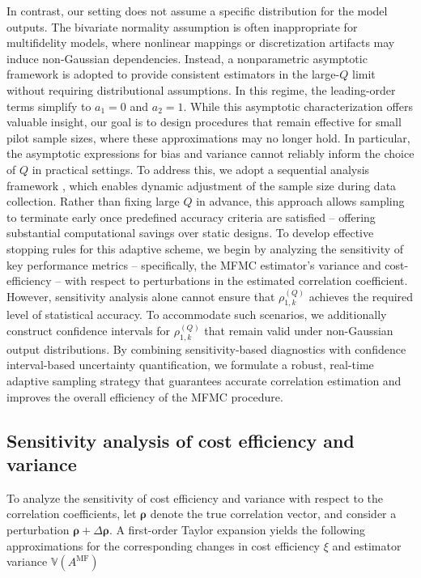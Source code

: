 In contrast, our setting does not assume a specific distribution for the model outputs. The bivariate normality assumption is often inappropriate for multifidelity models, where nonlinear mappings or discretization artifacts may induce non-Gaussian dependencies. Instead, a nonparametric asymptotic framework \cite{Og:2006, Pi:1937} is adopted to provide consistent estimators in the large-$Q$ limit without requiring distributional assumptions. In this regime, the leading-order terms simplify to $a_1 = 0$ and $a_2 = 1$. While this asymptotic characterization offers valuable insight, our goal is to design procedures that remain effective for small pilot sample sizes, where these approximations may no longer hold. In particular, the asymptotic expressions for bias and variance cannot reliably inform the choice of $Q$ in practical settings. To address this, we adopt a sequential analysis framework \cite{La:2001,Wa:1947}, which enables dynamic adjustment of the sample size during data collection. Rather than fixing large $Q$ in advance, this approach allows sampling to terminate early once predefined accuracy criteria are satisfied -- offering substantial computational savings over static designs. To develop effective stopping rules for this adaptive scheme, we begin by analyzing the sensitivity of key performance metrics -- specifically, the MFMC estimator’s variance and cost-efficiency -- with respect to perturbations in the estimated correlation coefficient. However, sensitivity analysis alone cannot ensure that $\rho_{1,k}^{(Q)}$ achieves the required level of statistical accuracy.  To accommodate such scenarios, we additionally construct confidence intervals for $\rho_{1,k}^{(Q)}$ that remain valid under non-Gaussian output distributions. By combining sensitivity-based diagnostics with confidence interval-based uncertainty quantification, we formulate a robust, real-time adaptive sampling strategy that guarantees accurate correlation estimation and improves the overall efficiency of the MFMC procedure.





\subsection{Sensitivity analysis of cost efficiency and variance}
To analyze the sensitivity of cost efficiency and variance with respect to the correlation coefficients, let $\boldsymbol{\rho}$ denote the true correlation vector, and consider a perturbation $\boldsymbol{\rho} + \Delta \boldsymbol{\rho}$. A first-order Taylor expansion yields the following approximations for the corresponding changes in cost efficiency $\xi$ and estimator variance $\mathbb{V}(A^{\text{MF}})$


